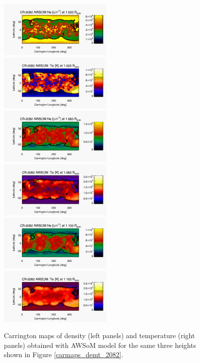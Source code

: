 \documentclass[namedreferences]{solarphysics}
\begin{document}
\begin{article}
\begin{figure}[h!]
\begin{center}
\includegraphics[width=0.495\textwidth]{figs/map_Ne_awsom_2082_185_short_1025_Rsun.pdf}
\includegraphics[width=0.495\textwidth]{figs/map_Te_awsom_2082_185_short_1025_Rsun.pdf}
\includegraphics[width=0.495\textwidth]{figs/map_Ne_awsom_2082_185_short_1065_Rsun.pdf}
\includegraphics[width=0.495\textwidth]{figs/map_Te_awsom_2082_185_short_1065_Rsun.pdf}
\includegraphics[width=0.495\textwidth]{figs/map_Ne_awsom_2082_185_short_1105_Rsun.pdf}
\includegraphics[width=0.495\textwidth]{figs/map_Te_awsom_2082_185_short_1105_Rsun.pdf}
\caption{Carrington maps of density (left panels) and temperature (right panels) obtained with AWSoM model for the same three heights shown in Figure \ref{carmaps_demt_2082}.}
\label{carmaps_awsom_2082}
\end{center}
\end{figure}


\end{article}
\end{document}
